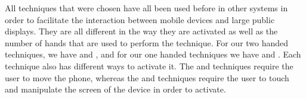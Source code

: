 \begin{figure}[H]
	\label{fig:tiltTechnique}
\end{figure}

All techniques that were chosen have all been used before in other systems in order to facilitate the interaction between mobile devices and large public displays.
They are all different in the way they are activated as well as the number of hands that are used to perform the technique.
For our two handed techniques, we have \throw and \grab, and for our one handed techniques we have \tilt and \swipe. 
Each technique also has different ways to activate it. 
The \throw and \tilt techniques require the user to move the phone, whereas the \swipe and \grab techniques require the user to touch and manipulate the screen of the device in order to activate. 


